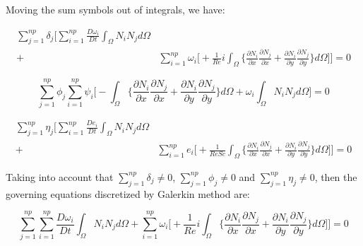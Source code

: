 \medksip
\noindent
Moving the sum symbols out of integrals, we have:

\begin{equation}
 \begin{aligned} 
  \sum\limits_{j=1}^{np} \delta_j \Bigg[
  \sum\limits_{i=1}^{np} \frac{D \omega_i}{Dt} 
  \int_{\Omega} N_i N_j d\Omega & 
  \\[5pt]
   + & \sum\limits_{i=1}^{np} \omega_i \Bigg[
   + \frac{1}{\textit{Re}} i
   \int_{\Omega} \Bigg\{ 
   \frac{\partial N_i}{\partial x} 
   \frac{\partial N_j}{\partial x} 
   + 
   \frac{\partial N_i}{\partial y} 
   \frac{\partial N_j}{\partial y} 
   \Bigg\} d\Omega
 \Bigg] \Bigg] = 0
 \end{aligned}
\end{equation}

\begin{equation}
  \sum\limits_{j=1}^{np} \phi_j
  \sum\limits_{i=1}^{np} \psi_i \Bigg[
  - \int_{\Omega} \Bigg\{ 
                  \frac{\partial N_i}{\partial x} 
                  \frac{\partial N_j}{\partial x} 
  +               \frac{\partial N_i}{\partial y} 
                  \frac{\partial N_j}{\partial y} 
  \Bigg\} d\Omega
  + \omega_i \int_{\Omega} N_i N_j d\Omega
  \Bigg] = 0
\end{equation}

\begin{equation}
 \begin{aligned} 
  \sum\limits_{j=1}^{np} \eta_j \Bigg[
  \sum\limits_{i=1}^{np} \frac{D e_i}{Dt} 
  \int_{\Omega} N_i N_j d\Omega & 
  \\[5pt]
   + & \sum\limits_{i=1}^{np} e_i \Bigg[
   + \frac{1}{\textit{ReSc}} 
   \int_{\Omega} \Bigg\{ 
   \frac{\partial N_i}{\partial x} 
   \frac{\partial N_j}{\partial x} 
   + 
   \frac{\partial N_i}{\partial y} 
   \frac{\partial N_j}{\partial y} 
   \Bigg\} d\Omega
 \Bigg] \Bigg] = 0
 \end{aligned}
\end{equation}


\noindent
Taking into account that
$\sum\limits_{j=1}^{np} \delta_j \neq 0$,
$\sum\limits_{j=1}^{np} \phi_j \neq 0$ and
$\sum\limits_{j=1}^{np} \eta_j \neq 0$,
then the governing equations discretized
by Galerkin method are:

\begin{equation}
  \sum\limits_{j=1}^{np}
  \sum\limits_{i=1}^{np} \frac{D \omega_i}{Dt} 
  \int_{\Omega} N_i N_j d\Omega 
   + \sum\limits_{i=1}^{np} \omega_i \Bigg[
   + \frac{1}{\textit{Re}} i
   \int_{\Omega} \Bigg\{ 
   \frac{\partial N_i}{\partial x} 
   \frac{\partial N_j}{\partial x} 
   + 
   \frac{\partial N_i}{\partial y} 
   \frac{\partial N_j}{\partial y} 
   \Bigg\} d\Omega
 \Bigg] \Bigg] = 0
\end{equation}

